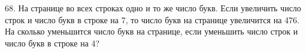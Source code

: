 68. На странице во всех строках одно и то же число букв. Если увеличить число строк и число букв в строке на 7, то число букв на странице увеличится на 476. На сколько уменьшится число букв на странице, если уменьшить число строк и число букв в строке на 4?\\

